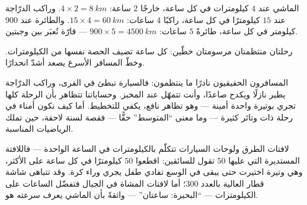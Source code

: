 \begin{example}\label{ex:g5:speed-distance-time:journeys}
الماشي عند $4$ كيلومترات في كل ساعة، خارجًا $2$ ساعة:
$4 \times 2 = \qty{8}{km}$. وراكب الدرّاجة عند $15$ كيلومترًا في
كل ساعة، راكبًا $4$ ساعات: $15 \times 4 = \qty{60}{km}$. والطائرة
عند $900$ كيلومتر في كل ساعة، طائرةً $5$ ساعات: $900 \times 5 =
\qty{4500}{km}$ --- قارّة تُعبَر بين وجبتين.
\end{example}

\begin{omfigure}

{\small رحلتان منتظمتان مرسومتان خطّين: كل ساعة تضيف الحصة نفسها
من الكيلومترات. وخطّ المسافر الأسرع يصعد أشدّ انحدارًا.}
\end{omfigure}

\begin{remark}\label{rem:g5:speed-distance-time:steady}
المسافرون الحقيقيون نادرًا ما ينتظمون: فالسيارة تبطئ في القرى،
وراكب الدرّاجة يطير نازلًا ويكدح صاعدًا، وأنت تتمهّل عند
المخبز. وحساباتنا تتظاهر بأن الرحلة كلها تجري بوتيرة واحدة
أمينة --- وهو تظاهر نافع، يكفي للتخطيط. أما كيف نكون أمناء في
رحلة ذات وتائر كثيرة --- وما معنى ``المتوسط'' حقًّا --- فقصة
لسنة لاحقة، حين تملك الرياضيات المناسبة.
\end{remark}

\begin{example}\label{ex:g5:speed-distance-time:signs}
لافتات الطرق ولوحات السيارات تتكلّم بالكيلومترات في الساعة
الواحدة --- فاللافتة المستديرة التي عليها $50$ تقول للسائقين:
اقطعوا $50$ كيلومترًا في كل ساعة على الأكثر، وهي وتيرة اختيرت
حتى يبقى في الوسع تفادي طفل يجري وراء كرة. وقد تتباهى شاشة قطار
 العالية بالعدد $300$؛ أما لافتات المشاة في الجبال فتفضّل
الساعات على الكيلومترات --- ``البحيرة: ساعتان'' --- واثقةً بأن
الماشي يعرف سرعته هو.
\end{example}

